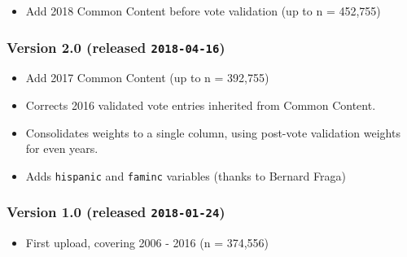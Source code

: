 \documentclass[10pt,article,oneside]{memoir}
\theoremstyle{definition}
\begin{document}
\begin{itemize}
\tightlist
\item
  Add 2018 Common Content before vote validation (up to n = 452,755)
\end{itemize}

\subsubsection{\texorpdfstring{Version 2.0 (released
\texttt{2018-04-16})}{Version 2.0 (released 2018-04-16)}}\label{version-2.0-released-2018-04-16}

\begin{itemize}
\tightlist
\item
  Add 2017 Common Content (up to n = 392,755)
\item
  Corrects 2016 validated vote entries inherited from Common Content.
\item
  Consolidates weights to a single column, using post-vote validation
  weights for even years.
\item
  Adds \texttt{hispanic} and \texttt{faminc} variables (thanks to
  Bernard Fraga)
\end{itemize}

\subsubsection{\texorpdfstring{Version 1.0 (released
\texttt{2018-01-24})}{Version 1.0 (released 2018-01-24)}}\label{version-1.0-released-2018-01-24}

\begin{itemize}
\tightlist
\item
  First upload, covering 2006 - 2016 (n = 374,556)
\end{itemize}
\end{document}
